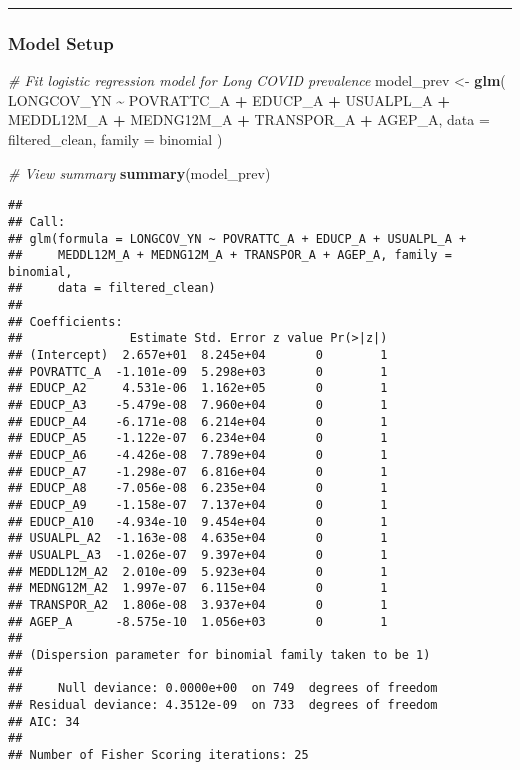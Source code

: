 \documentclass[
]{article}
\newenvironment{Shaded}{\begin{snugshade}}{\end{snugshade}}
\newcommand{\AttributeTok}[1]{\textcolor[rgb]{0.13,0.29,0.53}{#1}}
\newcommand{\CommentTok}[1]{\textcolor[rgb]{0.56,0.35,0.01}{\textit{#1}}}
\newcommand{\FunctionTok}[1]{\textcolor[rgb]{0.13,0.29,0.53}{\textbf{#1}}}
\newcommand{\NormalTok}[1]{#1}
\newcommand{\OtherTok}[1]{\textcolor[rgb]{0.56,0.35,0.01}{#1}}
\newcommand{\SpecialCharTok}[1]{\textcolor[rgb]{0.81,0.36,0.00}{\textbf{#1}}}
\begin{document}
\begin{center}\rule{0.5\linewidth}{0.5pt}\end{center}

\subsubsection{Model Setup}\label{model-setup}

\begin{Shaded}
\begin{Highlighting}[]
\CommentTok{\# Fit logistic regression model for Long COVID prevalence}
\NormalTok{model\_prev }\OtherTok{\textless{}{-}} \FunctionTok{glm}\NormalTok{(}
\NormalTok{  LONGCOV\_YN }\SpecialCharTok{\textasciitilde{}}\NormalTok{ POVRATTC\_A }\SpecialCharTok{+}\NormalTok{ EDUCP\_A }\SpecialCharTok{+}\NormalTok{ USUALPL\_A }\SpecialCharTok{+}\NormalTok{ MEDDL12M\_A }\SpecialCharTok{+}
\NormalTok{    MEDNG12M\_A }\SpecialCharTok{+}\NormalTok{ TRANSPOR\_A }\SpecialCharTok{+}\NormalTok{ AGEP\_A,}
  \AttributeTok{data =}\NormalTok{ filtered\_clean,}
  \AttributeTok{family =}\NormalTok{ binomial}
\NormalTok{)}

\CommentTok{\# View summary}
\FunctionTok{summary}\NormalTok{(model\_prev)}
\end{Highlighting}
\end{Shaded}

\begin{verbatim}
## 
## Call:
## glm(formula = LONGCOV_YN ~ POVRATTC_A + EDUCP_A + USUALPL_A + 
##     MEDDL12M_A + MEDNG12M_A + TRANSPOR_A + AGEP_A, family = binomial, 
##     data = filtered_clean)
## 
## Coefficients:
##               Estimate Std. Error z value Pr(>|z|)
## (Intercept)  2.657e+01  8.245e+04       0        1
## POVRATTC_A  -1.101e-09  5.298e+03       0        1
## EDUCP_A2     4.531e-06  1.162e+05       0        1
## EDUCP_A3    -5.479e-08  7.960e+04       0        1
## EDUCP_A4    -6.171e-08  6.214e+04       0        1
## EDUCP_A5    -1.122e-07  6.234e+04       0        1
## EDUCP_A6    -4.426e-08  7.789e+04       0        1
## EDUCP_A7    -1.298e-07  6.816e+04       0        1
## EDUCP_A8    -7.056e-08  6.235e+04       0        1
## EDUCP_A9    -1.158e-07  7.137e+04       0        1
## EDUCP_A10   -4.934e-10  9.454e+04       0        1
## USUALPL_A2  -1.163e-08  4.635e+04       0        1
## USUALPL_A3  -1.026e-07  9.397e+04       0        1
## MEDDL12M_A2  2.010e-09  5.923e+04       0        1
## MEDNG12M_A2  1.997e-07  6.115e+04       0        1
## TRANSPOR_A2  1.806e-08  3.937e+04       0        1
## AGEP_A      -8.575e-10  1.056e+03       0        1
## 
## (Dispersion parameter for binomial family taken to be 1)
## 
##     Null deviance: 0.0000e+00  on 749  degrees of freedom
## Residual deviance: 4.3512e-09  on 733  degrees of freedom
## AIC: 34
## 
## Number of Fisher Scoring iterations: 25
\end{verbatim}
\end{document}
